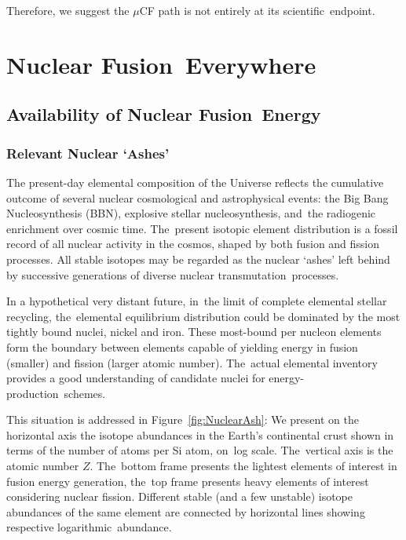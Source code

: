 \documentclass[particles,article,accept,pdftex,moreauthors]{Definitions/mdpi}
\begin{document}
Therefore, we suggest the $\mu$CF path is not entirely at its scientific~endpoint.

\section{Nuclear Fusion~Everywhere}\label{sec:Fusion}
\unskip
\subsection{Availability of Nuclear Fusion~Energy}\label{ssec:Nenergy}
\unskip
\subsubsection{Relevant Nuclear `Ashes'}\label{sssec:NuclearAshes}
The present-day elemental composition of the Universe reflects the cumulative outcome of several nuclear cosmological and astrophysical events: the Big Bang Nucleosynthesis (BBN), explosive stellar nucleosynthesis, and~the radiogenic enrichment over cosmic time. The~present isotopic element distribution is a fossil record of all nuclear activity in the cosmos, shaped by both fusion and fission processes. All stable isotopes may be regarded as the nuclear `ashes' left behind by successive generations of diverse nuclear transmutation~processes.

In a hypothetical very distant future, in~the limit of complete elemental stellar recycling, the~elemental equilibrium distribution could be dominated by the most tightly bound nuclei, nickel and iron. These most-bound per nucleon elements form the boundary between elements capable of yielding energy in fusion (smaller) and fission (larger atomic number). The~actual elemental inventory provides a good understanding of candidate nuclei for energy-production~schemes.

This situation is addressed in Figure~\ref{fig:NuclearAsh}: We present on the horizontal axis the isotope abundances in the Earth's continental crust shown in terms of the number of atoms per Si atom, on~log scale. The~vertical axis is the atomic number $Z$. The~bottom frame presents the lightest elements of interest in fusion energy generation, the~top frame presents heavy elements of interest considering nuclear fission. Different stable (and a few unstable) isotope abundances of the same element are connected by horizontal lines showing respective logarithmic~abundance.
\end{document}

